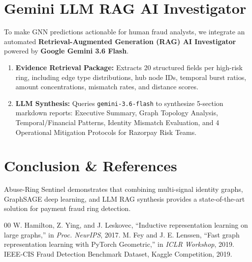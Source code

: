 \documentclass[conference]{IEEEtran}
\begin{document}
\section{Gemini LLM RAG AI Investigator}
To make GNN predictions actionable for human fraud analysts, we integrate an automated \textbf{Retrieval-Augmented Generation (RAG) AI Investigator} powered by \textbf{Google Gemini 3.6 Flash}.
\begin{enumerate}
    \item \textbf{Evidence Retrieval Package:} Extracts 20 structured fields per high-risk ring, including edge type distributions, hub node IDs, temporal burst ratios, amount concentrations, mismatch rates, and distance scores.
    \item \textbf{LLM Synthesis:} Queries \texttt{gemini-3.6-flash} to synthesize 5-section markdown reports: Executive Summary, Graph Topology Analysis, Temporal/Financial Patterns, Identity Mismatch Evaluation, and 4 Operational Mitigation Protocols for Razorpay Risk Teams.
\end{enumerate}

\section{Conclusion \& References}
Abuse-Ring Sentinel demonstrates that combining multi-signal identity graphs, GraphSAGE deep learning, and LLM RAG synthesis provides a state-of-the-art solution for payment fraud ring detection.

\begin{thebibliography}{00}
 W. Hamilton, Z. Ying, and J. Leskovec, ``Inductive representation learning on large graphs,'' in \textit{Proc. NeurIPS}, 2017.
 M. Fey and J. E. Lenssen, ``Fast graph representation learning with PyTorch Geometric,'' in \textit{ICLR Workshop}, 2019.
 IEEE-CIS Fraud Detection Benchmark Dataset, Kaggle Competition, 2019.
\end{thebibliography}
\end{document}
